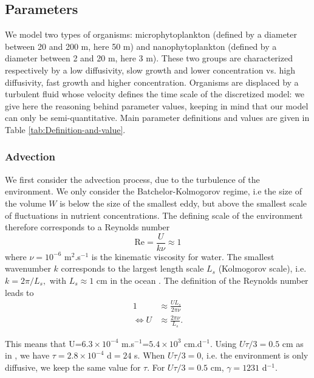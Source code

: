 \documentclass[english]{article}
\begin{document}
\subsection*{Parameters}

We model two types of organisms: microphytoplankton (defined by a
diameter between 20 and 200 \textmu m, here 50 \textmu m) and nanophytoplankton
(defined by a diameter between 2 and 20 \textmu m, here 3 \textmu
m). These two groups are characterized respectively by a low diffusivity,
slow growth and lower concentration vs. high diffusivity, fast growth
and higher concentration. Organisms are displaced by a turbulent fluid
whose velocity defines the time scale of the discretized model: we
give here the reasoning behind parameter values, keeping in mind that
our model can only be semi-quantitative. Main parameter definitions
and values are given in Table \ref{tab:Definition-and-value}.

\subsubsection*{Advection}

We first consider the advection process, due to the turbulence of
the environment. We only consider the Batchelor-Kolmogorov regime,
i.e the size of the volume $W$ is below the size of the smallest
eddy, but above the smallest scale of fluctuations in nutrient concentrations.
The defining scale of the environment therefore corresponds to a Reynolds
number
\begin{equation}
\text{Re}=\frac{U}{k\nu}\approx1\label{eq:reynolds_def}
\end{equation}
where $\nu=10^{-6}$ m$^{2}$.s$^{-1}$ is the kinematic viscosity
for water. The smallest wavenumber $k$ corresponds to the largest
length scale $L_{s}$ (Kolmogorov scale), i.e. $k=2\pi/L_{s},$ with
$L_{s}\approx1$ cm in the ocean \citep{barton_impact_2014}. The
definition of the Reynolds number leads to
\begin{equation}
\begin{array}{cc}
1 & \approx\frac{UL_{s}}{2\pi\nu}\\
\Leftrightarrow U & \approx\frac{2\pi\nu}{L_{s}}.
\end{array}\label{eq:compute_U}
\end{equation}

This means that U=$6.3\times10^{-4}$ m.s$^{-1}$=$5.4\times10^{3}$
cm.d$^{-1}$. Using $U\tau/3=0.5$ cm as in \citet{young_reproductive_2001},
we have $\tau=2.8\times10^{-4}$ d$=24$ s. When $U\tau/3=0$, i.e.
the environment is only diffusive, we keep the same value for $\tau$.
For $U\tau/3=0.5$ cm, $\gamma=1231$ d$^{-1}$.
\end{document}
